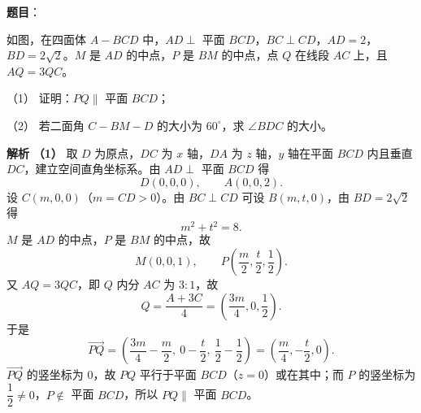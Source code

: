 \begin{answer}


\end{answer}
\begin{answer}

\textbf{题目}：

如图，在四面体 $A-BCD$ 中，$AD\perp$ 平面 $BCD$，$BC\perp CD$，$AD=2$，$BD=2\sqrt2$。$M$ 是 $AD$ 的中点，$P$ 是 $BM$ 的中点，点 $Q$ 在线段 $AC$ 上，且 $AQ=3QC$。

（1） 证明：$PQ\parallel$ 平面 $BCD$；

（2） 若二面角 $C-BM-D$ 的大小为 $60^\circ$，求 $\angle BDC$ 的大小。
\nopagebreak[4]
\begin{center}\end{center}
\nopagebreak[4]
\textbf{解析}
\textbf{（1）} 取 $D$ 为原点，$DC$ 为 $x$ 轴，$DA$ 为 $z$ 轴，$y$ 轴在平面 $BCD$ 内且垂直 $DC$，建立空间直角坐标系。由 $AD\perp$ 平面 $BCD$ 得
\nopagebreak[4]
\[D(0,0,0),\qquad A(0,0,2).\]
设 $C(m,0,0)$（$m=CD>0$）。由 $BC\perp CD$ 可设 $B(m,t,0)$，由 $BD=2\sqrt2$ 得
\nopagebreak[4]
\[m^2+t^2=8.\]
$M$ 是 $AD$ 的中点，$P$ 是 $BM$ 的中点，故
\nopagebreak[4]
\[M(0,0,1),\qquad P\left(\frac m2,\frac t2,\frac12\right).\]
又 $AQ=3QC$，即 $Q$ 内分 $AC$ 为 $3:1$，故
\nopagebreak[4]
\[Q=\frac{A+3C}{4}=\left(\frac{3m}4,0,\frac12\right).\]
于是
\nopagebreak[4]
\[\overrightarrow{PQ}=\left(\frac{3m}4-\frac m2,\ 0-\frac t2,\ \frac12-\frac12\right)
=\left(\frac m4,-\frac t2,0\right).\]
$\overrightarrow{PQ}$ 的竖坐标为 $0$，故 $PQ$ 平行于平面 $BCD$（$z=0$）或在其中；而 $P$ 的竖坐标为 $\dfrac12\neq0$，$P\notin$ 平面 $BCD$，所以 $PQ\parallel$ 平面 $BCD$。


\end{answer}
